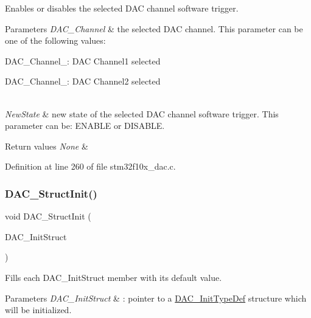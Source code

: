 Enables or disables the selected D\+AC channel software trigger. 


\begin{DoxyParams}{Parameters}
{\em D\+A\+C\+\_\+\+Channel} & the selected D\+AC channel. This parameter can be one of the following values\+: \begin{DoxyItemize}
\item D\+A\+C\+\_\+\+Channel\+\_\+: D\+AC Channel1 selected \item D\+A\+C\+\_\+\+Channel\+\_\+: D\+AC Channel2 selected \end{DoxyItemize}
\\
\hline
{\em New\+State} & new state of the selected D\+AC channel software trigger. This parameter can be\+: E\+N\+A\+B\+LE or D\+I\+S\+A\+B\+LE. \\
\hline
\end{DoxyParams}

\begin{DoxyRetVals}{Return values}
{\em None} & \\
\hline
\end{DoxyRetVals}


Definition at line 260 of file stm32f10x\+\_\+dac.\+c.

\mbox{\label{group___d_a_c___private___functions_gadfc270974d54cb5fa5f92556015c4046}} 
\subsubsection{\texorpdfstring{D\+A\+C\+\_\+\+Struct\+Init()}{DAC\_StructInit()}}
{\footnotesize\ttfamily void D\+A\+C\+\_\+\+Struct\+Init (\begin{DoxyParamCaption}\item[{\hyperlink{struct_d_a_c___init_type_def}{D\+A\+C\+\_\+\+Init\+Type\+Def} $\ast$}]{D\+A\+C\+\_\+\+Init\+Struct }\end{DoxyParamCaption})}



Fills each D\+A\+C\+\_\+\+Init\+Struct member with its default value. 


\begin{DoxyParams}{Parameters}
{\em D\+A\+C\+\_\+\+Init\+Struct} & \+: pointer to a \hyperlink{struct_d_a_c___init_type_def}{D\+A\+C\+\_\+\+Init\+Type\+Def} structure which will be initialized. \\
\hline
\end{DoxyParams}

